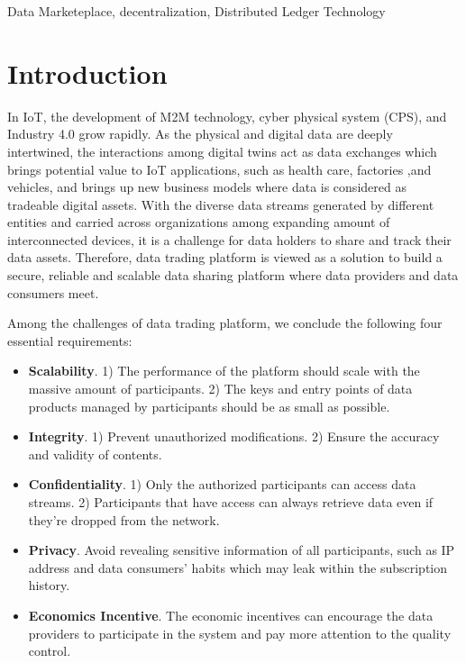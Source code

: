 \documentclass[conference]{IEEEtran}
\begin{document}
\begin{IEEEkeywords}
Data Marketeplace, decentralization, Distributed Ledger Technology
\end{IEEEkeywords}

\section{Introduction}
In IoT, the development of M2M technology\cite{M2M}, cyber physical system (CPS)\cite{CPS}, and Industry 4.0 grow rapidly. As the physical and digital data are deeply intertwined, the interactions among digital twins act as data exchanges\cite{digitaltwin} which brings potential value to IoT applications, such as health care\cite{healthCare}, factories ,and vehicles\cite{AutonomousDriving}, and brings up new business models where data is considered as tradeable digital assets. With the diverse data streams generated by different entities and carried across organizations among expanding amount of interconnected devices, it is a challenge for data holders to share and track their data assets. Therefore, data trading platform is viewed as a solution to build a secure, reliable and scalable data sharing platform where data providers and data consumers meet.

Among the challenges of data trading platform\cite{BigDataMarket}, we conclude the following four essential requirements:
\begin{itemize}
	\item \textbf{Scalability}. 
1) The performance of the platform should scale with the massive amount of participants. 2) The keys and entry points of data products managed by participants should be as small as possible. 
	\item \textbf{Integrity}. 1) Prevent unauthorized modifications. 2) Ensure the accuracy and validity of contents.	
	\item \textbf{Confidentiality}. 
1) Only the authorized participants can access data streams. 2) Participants that have access can always retrieve data even if they're dropped from the network.	
	\item \textbf{Privacy}. Avoid revealing sensitive information of all participants, such as IP address and data consumers' habits which may leak within the subscription history.
	\item \textbf{Economics Incentive}. The economic incentives can encourage the data providers to participate in the system and pay more attention to the quality control. 
\end{itemize}
\end{document}
